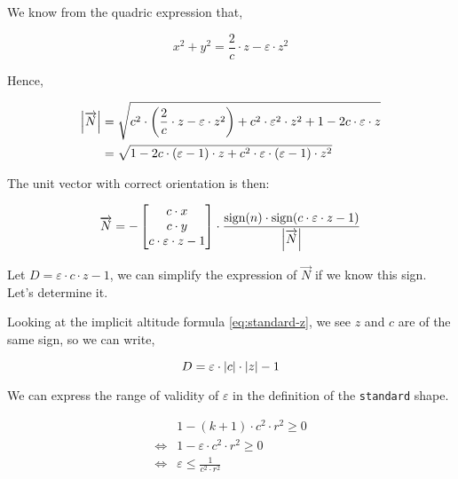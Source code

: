 We know from the quadric expression that,

\begin{equation}
x^2 + y^2 = \frac{2}{c} \cdot z - \varepsilon \cdot z^2
\end{equation}

Hence,

\begin{equation} \begin{split}
\abs{\overrightarrow{N}} &=
\sqrt{c^2 \cdot \left( \frac{2}{c} \cdot z - \varepsilon \cdot z^2 \right)
  + c^2 \cdot \varepsilon^2 \cdot z^2 + 1 - 2 c \cdot \varepsilon \cdot z} \\
&= \sqrt{1 - 2 c \cdot (\varepsilon - 1) \cdot z + c^2 \cdot \varepsilon \cdot
         (\varepsilon - 1) \cdot z^2}
\end{split} \end{equation}

The unit vector with correct orientation is then:

\begin{equation}
\overrightarrow{N} = -
\begin{bmatrix}
c \cdot x \\ c \cdot y \\ c \cdot \varepsilon \cdot z - 1
\end{bmatrix} \cdot
\frac{\textrm{sign}(n) \cdot \textrm{sign}(c \cdot \varepsilon \cdot z - 1)}
{\abs{\overrightarrow{N}}}
\end{equation}

Let $D = \varepsilon \cdot c \cdot z - 1$, we can simplify the expression
of $\overrightarrow{N}$ if we know this sign. Let's determine it.

Looking at the implicit altitude formula \cref{eq:standard-z}, we see
$z$ and $c$ are of the same sign, so we can write,

\begin{equation}
D = \varepsilon \cdot \abs{c} \cdot \abs{z} - 1
\end{equation}

We can express the range of validity of $\varepsilon$ in the definition
of the \lstinline{standard} shape.

\begin{equation} \begin{split}
& 1 - (k+1) \cdot c^2 \cdot r^2 \geq 0 \\
\iff & 1 - \varepsilon \cdot c^2 \cdot r^2 \geq 0 \\
\iff & \varepsilon \leq \frac{1}{c^2 \cdot r^2}
\end{split} \end{equation}

